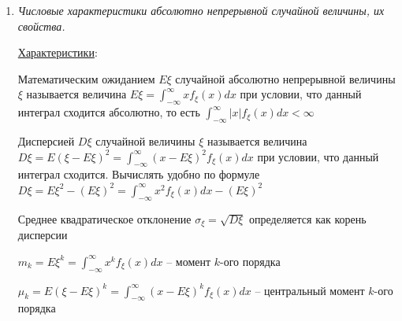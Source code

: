 \begin{enumerate}
\begin{enumerate}
        \item $F_\xi(x) = \int_{-\infty}^x f_\xi(x)dx$

        \item $F_\xi(x)$ непрерывна 

        \item $F_\xi(x)$ дифференцируема почти везде и $f_\xi(x) = F^\prime_\xi(x)$ для почти всех $x$

        \item $f_\xi(x) \geq 0$ по определению и как производная неубывающей $F_\xi(x)$

        \item $p(\xi = x) = 0 \ \forall x \in \Real$ -- так как $F_\xi(x)$ непрерывна

        \item $p(\alpha \leq \xi < \beta) = p(\alpha < \xi < \beta) = p(\alpha \leq \xi \leq \beta) = p(\alpha < \xi \leq \beta) = F(\beta) - F(\alpha)$

        \item \Ths Если $f(x) \geq 0$ и $\int_{-\infty}^{\infty} f(x)dx = 1$ (выполнены свойства 2 и 6), то $f(x)$ -- плотность некоторого распределения
    \end{enumerate}

    \item \textit{Числовые характеристики абсолютно непрерывной случайной величины, их свойства.}

    \hyperlink{attributesofcontinuousrandomvariable}{Характеристики}:

    Математическим ожиданием $E\xi$ случайной абсолютно непрерывной величины $\xi$ называется величина $E\xi = \int_{-\infty}^{\infty} xf_\xi(x) dx$ 
    при условии, что данный интеграл сходится абсолютно, то есть $\int_{-\infty}^\infty |x|f_\xi(x)dx < \infty$

    Дисперсией $D\xi$ случайной величины $\xi$ называется величина $D\xi = E(\xi - E\xi)^2 = \int_{-\infty}^\infty (x - E\xi)^2 f_\xi(x) dx$ при условии,
    что данный интеграл сходится. Вычислять удобно по формуле $D\xi = E\xi^2 - (E\xi)^2 = \int_{-\infty}^\infty x^2 f_\xi(x)dx - (E\xi)^2$

    Среднее квадратическое отклонение $\sigma_\xi = \sqrt{D\xi}$ определяется как корень дисперсии

    $m_k = E\xi^k = \int_{-\infty}^\infty x^k f_\xi(x)dx$ -- момент $k$-ого порядка

    $\mu_k = E(\xi - E\xi)^k = \int_{-\infty}^\infty (x - E\xi)^k f_\xi(x)dx$ -- центральный момент $k$-ого порядка
    

\end{enumerate}
